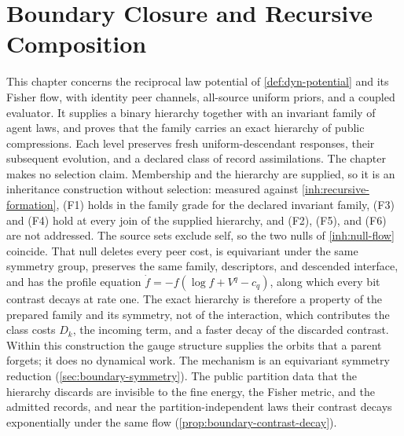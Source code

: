 \chapter{Boundary Closure and Recursive Composition}
\label{ch:boundary-closure}

This chapter concerns the reciprocal law potential of \cref{def:dyn-potential} and its Fisher flow, with identity peer channels, all-source uniform priors, and a coupled evaluator. It supplies a binary hierarchy together with an invariant family of agent laws, and proves that the family carries an exact hierarchy of public compressions. Each level preserves fresh uniform-descendant responses, their subsequent evolution, and a declared class of record assimilations. The chapter makes no selection claim. Membership and the hierarchy are supplied, so it is an inheritance construction without selection: measured against \cref{inh:recursive-formation}, (F1) holds in the family grade for the declared invariant family, (F3) and (F4) hold at every join of the supplied hierarchy, and (F2), (F5), and (F6) are not addressed. The source sets exclude self, so the two nulls of \cref{inh:null-flow} coincide. That null deletes every peer cost, is equivariant under the same symmetry group, preserves the same family, descriptors, and descended interface, and has the profile equation $\dot f=-f(\log f+V^q-c_q)$, along which every bit contrast decays at rate one. The exact hierarchy is therefore a property of the prepared family and its symmetry, not of the interaction, which contributes the class costs $D_k$, the incoming term, and a faster decay of the discarded contrast. Within this construction the gauge structure supplies the orbits that a parent forgets; it does no dynamical work. The mechanism is an equivariant symmetry reduction (\cref{sec:boundary-symmetry}). The public partition data that the hierarchy discards are invisible to the fine energy, the Fisher metric, and the admitted records, and near the partition-independent laws their contrast decays exponentially under the same flow (\cref{prop:boundary-contrast-decay}).

